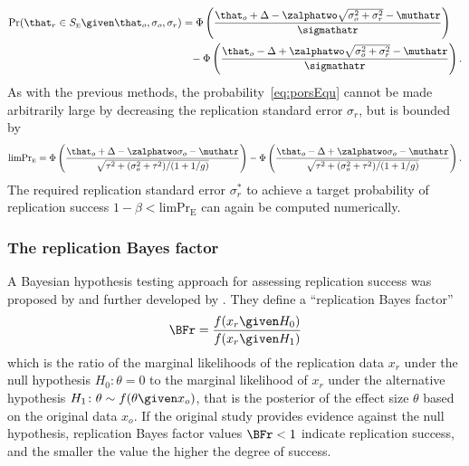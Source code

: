 \begin{align}
  \label{eq:porsEqu}
  \Pr(\that_{r} \in S_{\scriptscriptstyle \text{E}} \given \that_{o}, \sigma_{o}, \sigma_{r})
  &= %
    \Phi\left(\frac{\that_{o} + \Delta - \zalphatwo
  \sqrt{\sigma^{2}_{o} + \sigma^{2}_{r}} -\muthatr}{\sigmathatr}\right) \nonumber \\
&\phantom{=} -
  \Phi\left(\frac{\that_{o} - \Delta + \zalphatwo
  \sqrt{\sigma^{2}_{o} + \sigma^{2}_{r}} -\muthatr}{\sigmathatr}\right).
\end{align}
As with the previous methods, the probability~\eqref{eq:porsEqu} cannot be made
arbitrarily large by decreasing the replication standard error $\sigma_{r}$, but
is bounded by
\begin{align*}
  \text{limPr}_{\scriptscriptstyle \text{E}} =
  \Phi\left(\frac{\that_{o} + \Delta - \zalphatwo\sigma_{o}
  -\muthatr}{\sqrt{\tau^{2} + (\sigma^{2}_{o} + \tau^{2})/(1 + 1/g)}}\right)
  -\Phi\left(\frac{\that_{o} - \Delta + \zalphatwo\sigma_{o}
  -\muthatr}{\sqrt{\tau^{2} + (\sigma^{2}_{o} + \tau^{2})/(1 + 1/g)}}\right).
\end{align*}
The required replication standard error $\sigma_{r}^{*}$ to achieve a target
probability of replication success
$1 - \beta < \text{limPr}_{\scriptscriptstyle \text{E}}$ can again be computed
numerically.

\subsubsection{The replication Bayes factor}
A Bayesian hypothesis testing approach for assessing replication success was
proposed by \citet{Verhagen2014} and further developed by \citet{Ly2018}. They
define a ``replication Bayes factor''
\begin{align*}
  \BFr = \frac{f(x_{r} \given H_{0})}{f(x_{r} \given H_{1})}
\end{align*}
which is the ratio of the marginal likelihoods of the replication data $x_{r}$
under the null hypothesis $H_{0} \colon \theta = 0$ to the marginal likelihood
of $x_{r}$ under the alternative hypothesis
$H_{1} \colon \theta \sim f(\theta \given x_{o})$, that is the posterior of the
effect size $\theta$ based on the original data $x_{o}$. If the original study
provides evidence against the null hypothesis, replication Bayes factor values
$\BFr < 1$ indicate replication success, and the smaller the value the higher
the degree of success.

